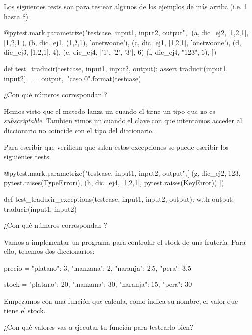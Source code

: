 \begin{exercise}
Los siguientes tests son para testear algunos de los ejemplos de más arriba (i.e. 1 hasta 8). 

\begin{small}
\begin{python}
@pytest.mark.parametrize("testcase, input1, input2, output",[
(a, dic_ej2, [1,2,1], [1,2,1]),
(b, dic_ej1, (1,2,1), 'onetwoone'),   
(c, dic_ej1, [1,2,1], 'onetwoone'),  
(d, dic_ej3, [1,2,1], 4),
(e, dic_ej4, ['1', '2', '3'], 6)
(f, dic_ej4, "123", 6),
])

def test_traducir(testcase, input1, input2, output):
    assert traducir(input1, input2) == output,\
           "caso {0}".format(testcase)
\end{python}
\end{small}     

¿Con qué números correspondan ?
\end{exercise} 




\begin{exercise}
Hemos visto que el metodo  lanza un  cuando el  tiene un tipo que no es {\em subscriptable}. Tambien vimos un
\pythoninline{KeyError} cuando el clave con que intentamos acceder al diccionario no coincide con el tipo del diccionario.

Para escribir  que verifican que salen estas excepciones se puede escribir los siguientes tests:

\begin{small}
\begin{python}
@pytest.mark.parametrize("testcase, input1, input2, output",[
(g, dic_ej2, 123, pytest.raises(TypeError)),   
(h, dic_ej4, [1,2,1], pytest.raises(KeyError))
])
   
def test_traducir_exceptions(testcase, input1, input2, output):
    with output:
        traducir(input1, input2)
\end{python}
\end{small}     
¿Con qué números correspondan \pythoninline{g, h}?
\end{exercise} 

\begin{exercise}
Vamos a implementar un programa para controlar el stock de una frutería. Para ello, tenemos dos diccionarios: 

\begin{small}
\begin{python}
precio = {
    "platano": 3,
    "manzana": 2,
    "naranja": 2.5,
    "pera": 3.5
    }

stock = {
    "platano": 20,
    "manzana": 30,
    "naranja": 15,
    "pera": 30
    }
\end{python}
\end{small}

Empezamos con una función  que calcula, como indica su nombre, el valor que tiene el stock.

¿Con qué valores vas a ejecutar tu función para testearlo bien?
\end{exercise} 

